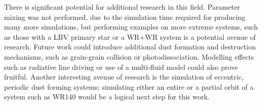 There is significant potential for additional research in this field.
Parameter mixing was not performed, due to the simulation time required for producing many more simulations, but performing examples on more extreme systems, such as those with a LBV primary star or a WR+WR system is a potential avenue of research.
Future work could introduce additional dust formation and destruction mechanisms, such as grain-grain collision or photodissociation.
Modelling effects such as radiative line driving or use of a multi-fluid model could also prove fruitful. 
Another interesting avenue of research is the simulation of eccentric, periodic dust forming systems; simulating either an entire or a partial orbit of a system such as WR140 would be a logical next step for this work.